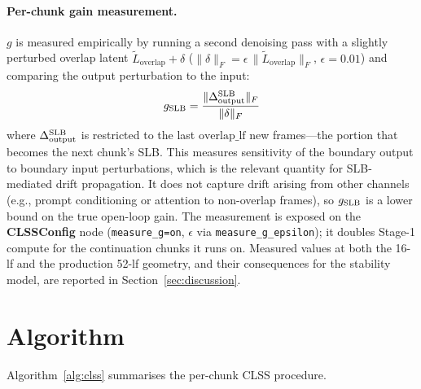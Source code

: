 \documentclass[12pt]{article}
\begin{document}
\paragraph{Per-chunk gain measurement.}
$g$ is measured empirically by running a second denoising pass with a slightly
perturbed overlap latent $\tilde{L}_{\text{overlap}} + \delta$
($\|\delta\|_F = \epsilon\,\|\tilde{L}_{\text{overlap}}\|_F$, $\epsilon=0.01$)
and comparing the output perturbation to the input:
\begin{equation}
g_{\rm SLB} = \frac{\|\Delta_{\rm output}^{\rm SLB}\|_F}{\|\delta\|_F}
\label{eq:gslb}
\end{equation}
where $\Delta_{\rm output}^{\rm SLB}$ is restricted to the last
$\text{overlap\_lf}$ new frames---the portion that becomes the next chunk's
SLB.  This measures sensitivity of the boundary output to boundary input
perturbations, which is the relevant quantity for SLB-mediated drift
propagation.  It does not capture drift arising from other channels (e.g.,
prompt conditioning or attention to non-overlap frames), so $g_{\rm SLB}$
is a lower bound on the true open-loop gain.  The measurement is exposed on
the \textbf{CLSSConfig} node (\texttt{measure\_g=on}, $\epsilon$ via
\texttt{measure\_g\_epsilon}); it doubles Stage-1 compute for the
continuation chunks it runs on.  Measured values at both the 16-lf and the
production 52-lf geometry, and their consequences for the stability model, are
reported in Section~\ref{sec:discussion}.

\section{Algorithm}
\label{sec:algorithm}

Algorithm~\ref{alg:clss} summarises the per-chunk CLSS procedure.
\end{document}
